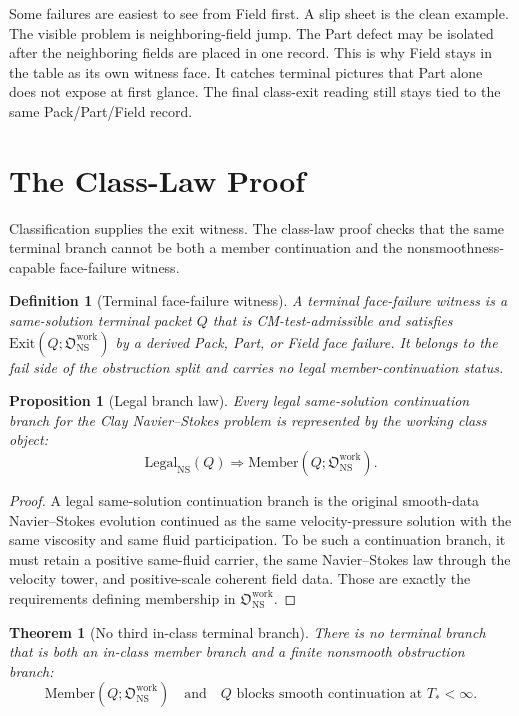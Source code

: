 \documentclass[11pt]{article}
\newtheorem{theorem}{Theorem}
\newtheorem{proposition}{Proposition}
\newtheorem{definition}{Definition}
\newcommand{\NS}{\mathrm{NS}}
\newcommand{\Member}{\mathrm{Member}}
\newcommand{\Exit}{\mathrm{Exit}}
\newcommand{\Legal}{\mathrm{Legal}}
\newcommand{\Owork}{\mathfrak O_{\NS}^{\mathrm{work}}}
\begin{document}
Some failures are easiest to see from Field first.
A slip sheet is the clean example.
The visible problem is neighboring-field jump.
The Part defect may be isolated after the neighboring fields are placed in one record.
This is why Field stays in the table as its own witness face.
It catches terminal pictures that Part alone does not expose at first glance.
The final class-exit reading still stays tied to the same Pack/Part/Field record.

\section{The Class-Law Proof}

Classification supplies the exit witness.
The class-law proof checks that the same terminal branch cannot be both a member continuation and the nonsmoothness-capable face-failure witness.

\begin{definition}[Terminal face-failure witness]
A terminal face-failure witness is a same-solution terminal packet \(Q\) that is CM-test-admissible and satisfies \(\Exit(Q;\Owork)\) by a derived Pack, Part, or Field face failure.
It belongs to the fail side of the obstruction split and carries no legal member-continuation status.
\end{definition}

\begin{proposition}[Legal branch law]
Every legal same-solution continuation branch for the Clay Navier--Stokes problem is represented by the working class object:
\[
  \Legal_{\NS}(Q)\Longrightarrow \Member(Q;\Owork).
\]
\end{proposition}

\begin{proof}
A legal same-solution continuation branch is the original smooth-data Navier--Stokes evolution continued as the same velocity-pressure solution with the same viscosity and same fluid participation.
To be such a continuation branch, it must retain a positive same-fluid carrier, the same Navier--Stokes law through the velocity tower, and positive-scale coherent field data.
Those are exactly the requirements defining membership in \(\Owork\).
\end{proof}

\begin{theorem}[No third in-class terminal branch]
There is no terminal branch that is both an in-class member branch and a finite nonsmooth obstruction branch:
\[
  \Member(Q;\Owork)
  \quad\text{and}\quad
  Q\text{ blocks smooth continuation at }T_*<\infty.
\]
\end{theorem}
\end{document}

